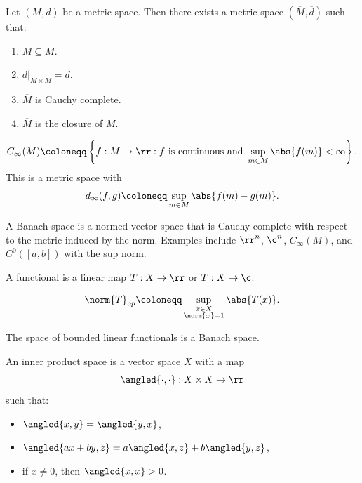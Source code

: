 

\begin{definition}[Completion]
    Let $(M,d)$ be a metric space.
    Then there exists a metric space $(\overline{M},\overline{d})$ such that:
    \begin{enumerate}
        \item $M\subseteq\overline{M}$.
        \item $\overline{d}|_{M\times M} = d$.
        \item $\overline{M}$ is Cauchy complete.
        \item $\overline{M}$ is the closure of $M$.
    \end{enumerate}
\end{definition}

\begin{definition}[$C_\infty(M)$]
    \[
        C_\infty(M) \coloneqq \left\{f:M\to\rr : \text{$f$ is continuous and } \sup_{m\in M}\abs{f(m)}<\infty\right\}.
    \]
    This is a metric space with
    \[
        d_\infty(f,g) \coloneqq \sup_{m\in M}\abs{f(m)-g(m)}.
    \]
\end{definition}

\begin{definition}
    A Banach space is a normed vector space that is Cauchy complete with respect to the metric induced by the norm.
    Examples include $\rr^n$, $\c^n$, $C_\infty(M)$, and $C^0([a,b])$ with the sup norm.
\end{definition}

\begin{definition}[Functional]
    A functional is a linear map $T:X\to\rr$ or $T:X\to\c$.
\end{definition}

\begin{definition}
    \[
        \norm{T}_{op} \coloneqq \sup_{\substack{x\in X\\ \norm{x} = 1}}\abs{T(x)}.
    \]
\end{definition}

\begin{remark}
    The space of bounded linear functionals is a Banach space.
\end{remark}

\begin{definition}
    An inner product space is a vector space $X$ with a map
    \[
        \angled{\cdot,\cdot}:X\times X\to \rr
    \]
    such that:
    \begin{itemize}
        \item $\angled{x,y} = \angled{y,x}$,
        \item $\angled{ax + by,z} = a\angled{x,z} + b\angled{y,z}$,
        \item if $x\neq 0$, then $\angled{x,x} > 0$.
    \end{itemize}
\end{definition}

